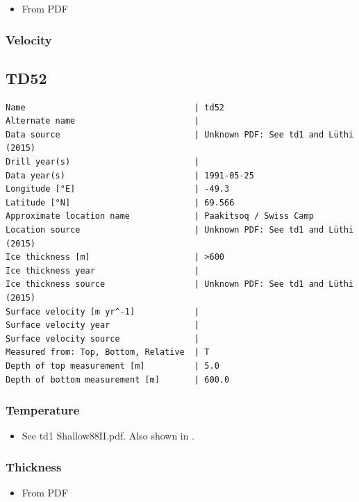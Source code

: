 \documentclass[article,a4paper,times,11pt,twoside]{article}
\begin{document}
\begin{itemize}
\item From PDF
\end{itemize}

\subsubsection{Velocity}
\label{sec:orgbe3de60}
\clearpage
\subsection{TD52}
\label{sec:orgba5f2f8}
\begin{verbatim}
Name                                  | td52
Alternate name                        | 
Data source                           | Unknown PDF: See td1 and Lüthi (2015)
Drill year(s)                         | 
Data year(s)                          | 1991-05-25
Longitude [°E]                        | -49.3
Latitude [°N]                         | 69.566
Approximate location name             | Paakitsoq / Swiss Camp
Location source                       | Unknown PDF: See td1 and Lüthi (2015)
Ice thickness [m]                     | >600
Ice thickness year                    | 
Ice thickness source                  | Unknown PDF: See td1 and Lüthi (2015)
Surface velocity [m yr^-1]            | 
Surface velocity year                 | 
Surface velocity source               | 
Measured from: Top, Bottom, Relative  | T
Depth of top measurement [m]          | 5.0
Depth of bottom measurement [m]       | 600.0
\end{verbatim}

\subsubsection{Temperature}
\label{sec:orgeac3047}

\begin{itemize}
\item See td1 Shallow88II.pdf. Also shown in \textcite{luthi_2015}.
\end{itemize}

\subsubsection{Thickness}
\label{sec:org92c01c6}

\begin{itemize}
\item From PDF
\end{itemize}
\end{document}
